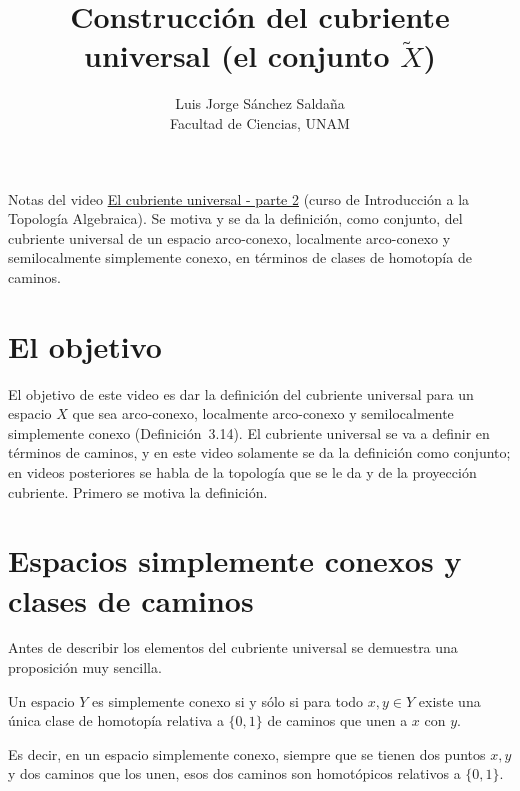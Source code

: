 \documentclass[11pt]{article}
\title{Construcción del cubriente universal (el conjunto $\tilde X$)}
\author{Luis Jorge Sánchez Saldaña\\[2pt]\small Facultad de Ciencias, UNAM}
\date{}
\begin{document}
\maketitle

\noindent\small Notas del video
\href{https://www.youtube.com/watch?v=oJqYD08jK6g}{\guillemotleft{}El cubriente universal - parte 2\guillemotright{}}
(curso de Introducción a la Topología Algebraica). Se motiva y se da la definición, como conjunto, del cubriente universal de un espacio arco-conexo, localmente arco-conexo y semilocalmente simplemente conexo, en términos de clases de homotopía de caminos.
\normalsize

\section*{El objetivo}

El objetivo de este video es dar la definición del cubriente universal para un espacio $X$ que sea arco-conexo, localmente arco-conexo y semilocalmente simplemente conexo (Definición~3.14). El cubriente universal se va a definir en términos de caminos, y en este video solamente se da la definición como conjunto; en videos posteriores se habla de la topología que se le da y de la proyección cubriente. Primero se motiva la definición.

\section*{Espacios simplemente conexos y clases de caminos}

Antes de describir los elementos del cubriente universal se demuestra una proposición muy sencilla.

\begin{prop}\label{prop:sc-unica-clase}
Un espacio $Y$ es simplemente conexo si y sólo si para todo $x,y\in Y$ existe una única clase de homotopía relativa a $\{0,1\}$ de caminos que unen a $x$ con $y$.
\end{prop}

Es decir, en un espacio simplemente conexo, siempre que se tienen dos puntos $x,y$ y dos caminos que los unen, esos dos caminos son homotópicos relativos a $\{0,1\}$.

\begin{center}
\end{center}
\end{document}
